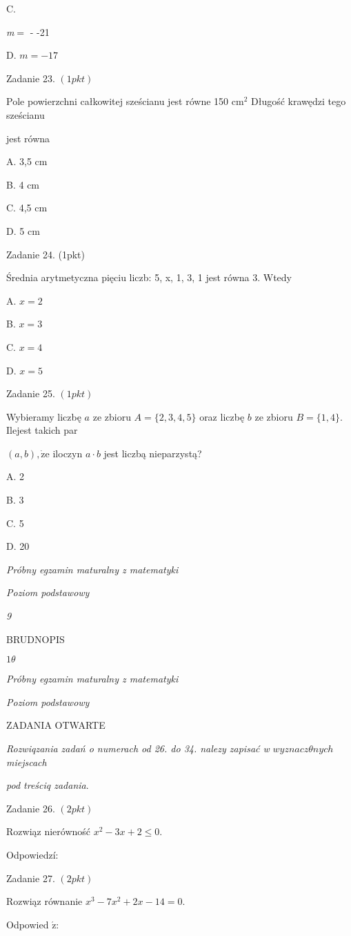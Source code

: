 \documentclass[a4paper,12pt]{article}
\begin{document}
C.

{\it m}$=$ - -21

D. $m=-17$

Zadanie 23. $(1pkt)$

Pole powierzchni całkowitej sześcianu jest równe 150 $\mathrm{c}\mathrm{m}^{2}$ Długość krawędzi tego sześcianu

jest równa

A. 3,5 cm

B. 4 cm

C. 4,5 cm

D. 5 cm

Zadanie 24. (1pkt)

Średnia arytmetyczna pięciu liczb: 5, x, 1, 3, 1 jest równa 3. Wtedy

A. $x=2$

B. $x=3$

C. $x=4$

D. $x=5$

Zadanie 25. $(1pkt)$

Wybieramy liczbę $a$ ze zbioru $A=\{2,3,4,5\}$ oraz liczbę $b$ ze zbioru $B=\{1,4\}$. Ilejest takich par

$(a,b), \dot{\mathrm{z}}\mathrm{e}$ iloczyn $a\cdot b$ jest liczbą nieparzystą?

A. 2

B. 3

C. 5

D. 20





{\it Próbny egzamin maturalny z matematyki}

{\it Poziom podstawowy}

{\it 9}

BRUDNOPIS





$ 1\theta$

{\it Próbny egzamin maturalny z matematyki}

{\it Poziom podstawowy}

ZADANIA OTWARTE

{\it Rozwiqzania zadań o numerach od 26. do 34. nalezy zapisać w} $wyznacz\theta nych$ {\it miejscach}

{\it pod treściq zadania}.

Zadanie 26. $(2pkt)$

Rozwiąz nierówność $x^{2}-3x+2\leq 0.$

Odpowiedzí:

Zadanie 27. $(2pkt)$

Rozwiąz równanie $x^{3}-7x^{2}+2x-14=0.$

Odpowied $\acute{\mathrm{z}}$:
\end{document}
